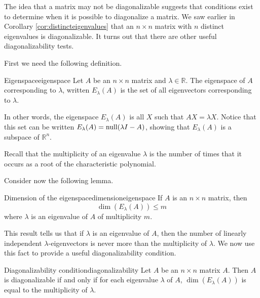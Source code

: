 The idea that a matrix may not be diagonalizable suggests that conditions exist to determine when it is possible to diagonalize a matrix. We saw earlier in Corollary \ref{cor:distincteigenvalues} that an $n \times n$ matrix with $n$ distinct eigenvalues is diagonalizable. It turns out that there are other useful diagonalizability tests. 

First we need the following definition.

\begin{definition}{Eigenspace}{eigenspace}
Let $A$ be an $n\times n$ matrix and $\lambda\in\mathbb{R}$.
The eigenspace of $A$ corresponding to $\lambda$, written $E_{\lambda}(A)$
is the set of all eigenvectors corresponding to $\lambda$. 
\end{definition}

In other words, the eigenspace $E_{\lambda}(A)$ is all $X$ such that $AX = \lambda X$. Notice that this set can be written $E_{\lambda}(A) = \mbox{null}(\lambda I - A)$, showing that $E_{\lambda}(A)$ is a subspace of $\mathbb{R}^n$. 

Recall that the multiplicity of an eigenvalue $\lambda$ is the number of times that it occurs as a root of the characteristic polynomial.

Consider now the following lemma.

\begin{lemma}{Dimension of the eigenspace}{dimensioneigenspace}
If $A$ is an $n\times n$ matrix,  then 
\[ \dim(E_{\lambda}(A))\leq m\]
where $\lambda$ is an
eigenvalue of $A$ of multiplicity $m$.
\end{lemma}

This result tells us that if $\lambda$ is an eigenvalue of $A$, then
the number of linearly independent $\lambda$-eigenvectors
is never more than the multiplicity of $\lambda$. We now use this fact to provide a useful diagonalizability condition.

\begin{theorem}{Diagonalizability condition}{diagonalizability}
Let $A$ be an $n \times n$ matrix $A$. Then $A$ is diagonalizable if and only if for each eigenvalue $\lambda$ of $A$, $\dim(E_{\lambda}(A))$ is equal to the multiplicity of $\lambda$.
\end{theorem}

